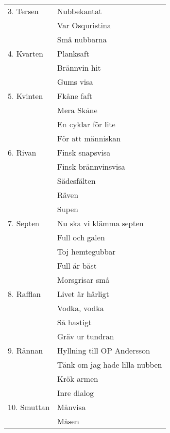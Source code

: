 \documentclass[a6paper,10pt]{article}
\begin{document}
\noindent
\begin{tabularx}{0.9\textwidth}{l X}
3. Tersen&Nubbekantat\\
 &Var Osquristina\\
 &Små nubbarna\\
4. Kvarten&Planksaft\\
 &Brännvin hit\\
 &Gums visa\\
5. Kvinten&Fkåne faft\\
 &Mera Skåne\\
 &En cyklar för lite\\
 &För att människan\\
6. Rivan&Finsk snapsvisa\\
 &Finsk brännvinsvisa\\
 &Sädesfälten\\
 &Räven\\
 &Supen\\
7. Septen&Nu ska vi klämma septen\\
 &Full och galen\\
 &Toj hemtegubbar\\
 &Full är bäst\\
 &Morsgrisar små\\
8. Rafflan&Livet är härligt\\
 &Vodka, vodka\\
 &Så hastigt\\
 &Gräv ur tundran\\
9. Rännan&Hyllning till OP Andersson\\
&Tänk om jag hade lilla nubben\\
&Krök armen\\
&Inre dialog\\
10. Smuttan&Månvisa\\
&Måsen
\end{tabularx}

\newpage
\end{document}
